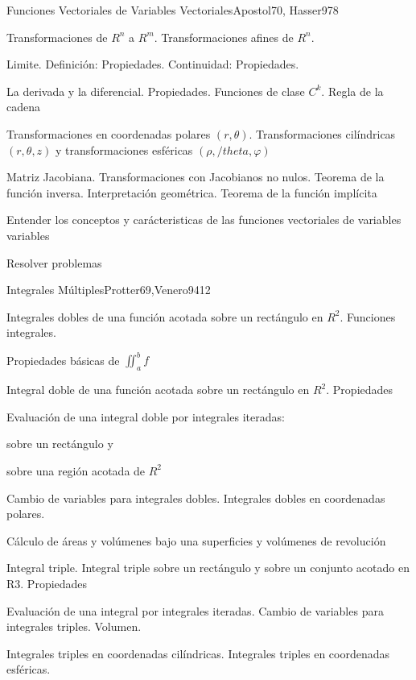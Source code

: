 \begin{syllabus}
\begin{unit}{Funciones Vectoriales de Variables Vectoriales}{Apostol70, Hasser97}{8}
   \begin{topics}
         \item  Transformaciones de $R^n$ a $R^m$. Transformaciones afines de $R^n$.
	 \item  Limite. Definición: Propiedades. Continuidad: Propiedades.
         \item  La derivada y la diferencial. Propiedades. Funciones de clase $C^k$. Regla de la cadena
	 \item  Transformaciones en coordenadas polares $(r,\theta)$. Transformaciones cilíndricas  $(r,\theta,z)$ y transformaciones esféricas $(\rho,/theta,\varphi)$
         \item  Matriz Jacobiana. Transformaciones con Jacobianos no nulos. Teorema de la función inversa. Interpretación geométrica. Teorema de la función implícita
   \end{topics}

   \begin{unitgoals}
         \item  Entender los conceptos y carácteristicas de las funciones vectoriales de variables variables
         \item  Resolver problemas
   \end{unitgoals}
\end{unit}

\begin{unit}{Integrales Múltiples}{Protter69,Venero94}{12}
   \begin{topics}
         \item  Integrales dobles de una función acotada sobre un rectángulo en $R^2$. Funciones integrales.
	 \item  Propiedades básicas de $\iint_{a}^{b} f$
         \item  Integral doble de una función acotada sobre un rectángulo en $R^2$. Propiedades
	 \item  Evaluación de una integral doble por integrales iteradas:
	\begin{subtopicos}
		\item sobre un rectángulo y
		\item sobre una región acotada de $R^2$
	\end{subtopicos}
         \item  Cambio de variables para integrales dobles. Integrales dobles en coordenadas polares.
	 \item  Cálculo de áreas y volúmenes bajo una superficies y volúmenes de revolución
         \item  Integral triple. Integral triple sobre un rectángulo y sobre un conjunto acotado en R3. Propiedades
	\item Evaluación de una integral por integrales iteradas. Cambio de variables para integrales triples. Volumen.
	\item Integrales triples en coordenadas cilíndricas. Integrales triples en coordenadas esféricas.
   \end{topics}


\end{unit}
\end{syllabus}
